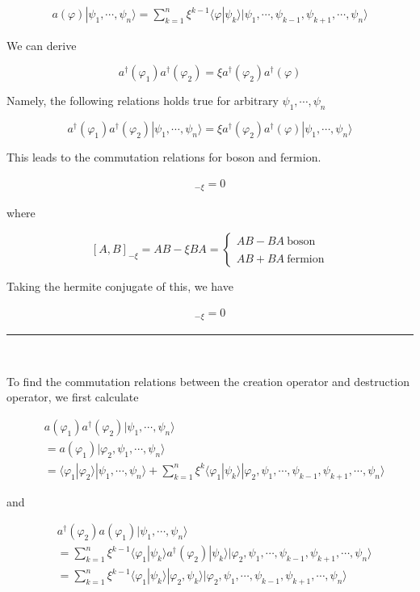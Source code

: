 \begin{align}\label{Eqs1.6.2}a(\varphi)|\psi_1,\cdots,\psi_n\rangle = \sum_{k=1}^n \xi^{k-1}\langle \varphi|\psi_k\rangle |\psi_1,\cdots,\psi_{k-1},\psi_{k+1},\cdots,\psi_n\rangle \end{align}


We can derive 

\[a^\dagger(\varphi_1)a^\dagger(\varphi_2) = \xi a^\dagger(\varphi_2)a^\dagger(\varphi) \]

Namely, the following relations holds true for arbitrary $\psi_1,\cdots,\psi_n$

\[a^\dagger(\varphi_1)a^\dagger(\varphi_2)|\psi_1,\cdots,\psi_n\rangle = \xi a^\dagger(\varphi_2)a^\dagger(\varphi) |\psi_1,\cdots,\psi_n\rangle\]

This leads to the commutation relations for boson and fermion. 

\begin{align}
[a^\dagger(\varphi_1),a^\dagger(\varphi_2)]_{-\xi} = 0
\end{align}

where

\[[A,B]_{-\xi} = AB - \xi BA = \begin{cases}AB-BA\ \text{boson}\\ \ \\ AB+BA \ \text{fermion}\end{cases}\]

Taking the hermite conjugate of this, we have

\begin{align}
[a(\varphi_1),a(\varphi_2)]_{-\xi} = 0
\end{align}

\hrule

\ 

To find the commutation relations between the creation operator and destruction operator, we first calculate 

\[\begin{split}
&a(\varphi_1)a^\dagger(\varphi_2)|\psi_1,\cdots,\psi_n\rangle \\
&=a(\varphi_1)|\varphi_2,\psi_1,\cdots,\psi_n\rangle\\
&= \langle\varphi_1|\varphi_2\rangle|\psi_1,\cdots,\psi_n\rangle + \sum_{k=1}^n\xi^k\langle\varphi_1|\psi_k\rangle|\varphi_2,\psi_1,\cdots,\psi_{k-1},\psi_{k+1},\cdots,\psi_n\rangle
\end{split}\]

and

\[\begin{split}
&a^\dagger(\varphi_2)a(\varphi_1)|\psi_1,\cdots,\psi_n\rangle \\
&= \sum_{k=1}^n\xi^{k-1}\langle \varphi_1|\psi_k\rangle a^\dagger(\varphi_2)|\psi_k\rangle|\varphi_2,\psi_1,\cdots,\psi_{k-1},\psi_{k+1},\cdots,\psi_n\rangle\\
&= \sum_{k=1}^n\xi^{k-1}\langle \varphi_1|\psi_k\rangle |\varphi_2,\psi_k\rangle|\varphi_2,\psi_1,\cdots,\psi_{k-1},\psi_{k+1},\cdots,\psi_n\rangle\\
\end{split}\]

